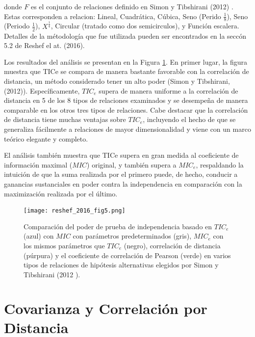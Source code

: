         donde $F$ es el conjunto de relaciones definido en Simon y Tibshirani (2012) \cite{SimonTibshirani}. Estas corresponden a relacion: Lineal, Cuadr\'atica, C\'ubica, Seno (Perido $\frac{1}{8}$), Seno (Periodo $\frac{1}{2}$), $X^\frac{1}{4}$, Circular (tratado como dos semicirculos), y Funci\'on escalera. Detalles de la m\'etodolog\'ia que fue utilizada pueden ser encontrados en la secc\'on 5.2 de Reshef el at. (2016)\cite{Reshef2016}.
    
    
        Los resultados del an\'alisis se presentan en la Figura \ref{reshef_2016_f5}. En primer lugar, la figura muestra que TICe se compara de manera bastante favorable con la correlaci\'on de distancia, un m\'etodo considerado tener un alto poder (Simon y Tibshirani, (2012)\cite{SimonTibshirani}). Espec\'ificamente, $TIC_e$ supera de manera uniforme a la correlaci\'on de distancia en 5 de los 8 tipos de relaciones examinados y se desempe\~na de manera comparable en los otros tres tipos de relaciones. Cabe destacar que la correlaci\'on de distancia tiene muchas ventajas sobre $TIC_e$, incluyendo el hecho de que se generaliza f\'acilmente a relaciones de mayor dimensionalidad y viene con un marco te\'orico elegante y completo.
    
        El an\'alisis tambi\'en muestra que TICe supera en gran medida al coeficiente de informaci\'on maximal ($MIC$) original, y tambi\'en supera a $MIC_e$, respaldando la intuici\'on de que la suma realizada por el primero puede, de hecho, conducir a ganancias sustanciales en poder contra la independencia en comparaci\'on con la maximizaci\'on realizada por el \'ultimo. 
    
    
        \begin{figure}[H] 
            \centering
            \texttt{[image: reshef\_2016\_fig5.png]}
            \caption{Comparaci\'on del poder de prueba de independencia basado en $TIC_e$ (azul) con $MIC$ con par\'ametros predeterminados (gris), $MIC_e$ con los mismos par\'ametros que $TIC_e$ (negro), correlaci\'on de distancia (p\'urpura) y el coeficiente de correlaci\'on de Pearson (verde) en varios tipos de relaciones de hip\'otesis alternativas elegidos por Simon y Tibshirani (2012 \cite{SimonTibshirani}).}
            \label{reshef_2016_f5}
        \end{figure}
    
    
\newpage    
\section[Covarianza y Correlaci\'on por Distancia]{Covarianza y Correlaci\'on por Distancia}

